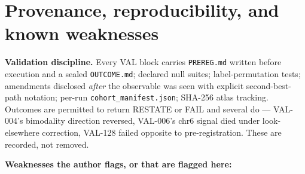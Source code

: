 \documentclass[12pt,a4paper]{article}
\begin{document}
\section{Provenance, reproducibility, and known weaknesses}

\textbf{Validation discipline.} Every VAL block carries \texttt{PREREG.md} written before execution and a sealed \texttt{OUTCOME.md}; declared null suites; label-permutation tests; amendments disclosed \textit{after} the observable was seen with explicit second-best-path notation; per-run \texttt{cohort\_manifest.json}; SHA-256 atlas tracking. Outcomes are permitted to return RESTATE or FAIL and several do --- VAL-004's bimodality direction reversed, VAL-006's chr6 signal died under look-elsewhere correction, VAL-128 failed opposite to pre-registration. These are recorded, not removed.


\textbf{Weaknesses the author flags, or that are flagged here:}
\end{document}
